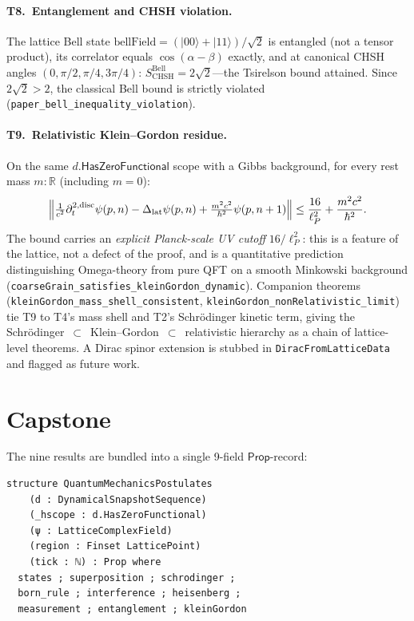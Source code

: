 \documentclass[aps,prl,twocolumn,superscriptaddress,nofootinbib,10pt]{revtex4-2}
\newcommand{\lP}{\ell_P}
\newcommand{\HasZF}{\mathsf{HasZeroFunctional}}
\newcommand{\BellField}{\mathrm{bellField}}
\begin{document}
\paragraph{T8.\ Entanglement and CHSH violation.}
The lattice Bell state $\BellField=(|00\rangle+|11\rangle)/\sqrt{2}$
is entangled (not a tensor product), its correlator equals
$\cos(\alpha-\beta)$ exactly, and at canonical CHSH angles
$(0,\pi/2,\pi/4,3\pi/4)$:
$S_{\mathrm{CHSH}}^{\mathrm{Bell}}=2\sqrt{2}$---the Tsirelson
bound attained. Since $2\sqrt{2}>2$, the classical Bell bound is
strictly violated
(\texttt{paper\_bell\_inequality\_violation}).

\paragraph{T9.\ Relativistic Klein--Gordon residue.}
On the same $d.\HasZF$ scope with a Gibbs background, for every
rest mass $m:\mathbb{R}$ (including $m = 0$):
\[
\Bigl\|
  \tfrac{1}{c^{2}}\partial_{t}^{2,\mathrm{disc}}\psi(p, n)
  - \Delta_{\mathrm{lat}}\psi(p, n)
  + \tfrac{m^{2} c^{2}}{\hbar^{2}}\psi(p, n+1)
\Bigr\|
\le \frac{16}{\lP^{2}} + \frac{m^{2} c^{2}}{\hbar^{2}}.
\]
The bound carries an \emph{explicit Planck-scale UV cutoff}
$16/\lP^{2}$: this is a feature of the lattice, not a defect of the
proof, and is a quantitative prediction distinguishing Omega-theory
from pure QFT on a smooth Minkowski background
(\texttt{coarseGrain\_satisfies\_kleinGordon\_dynamic}). Companion
theorems (\texttt{kleinGordon\_mass\_shell\_consistent},
\texttt{kleinGordon\_nonRelativistic\_limit}) tie T9 to T4's mass
shell and T2's Schr\"odinger kinetic term, giving the
Schr\"odinger~$\subset$~Klein--Gordon~$\subset$~relativistic
hierarchy as a chain of lattice-level theorems. A Dirac spinor
extension is stubbed in \texttt{DiracFromLatticeData} and flagged
as future work.

\section{Capstone}

The nine results are bundled into a single 9-field
$\mathsf{Prop}$-record:
\begin{lstlisting}
structure QuantumMechanicsPostulates
    (d : DynamicalSnapshotSequence)
    (_hscope : d.HasZeroFunctional)
    (ψ : LatticeComplexField)
    (region : Finset LatticePoint)
    (tick : ℕ) : Prop where
  states ; superposition ; schrodinger ;
  born_rule ; interference ; heisenberg ;
  measurement ; entanglement ; kleinGordon
\end{lstlisting}
\end{document}
